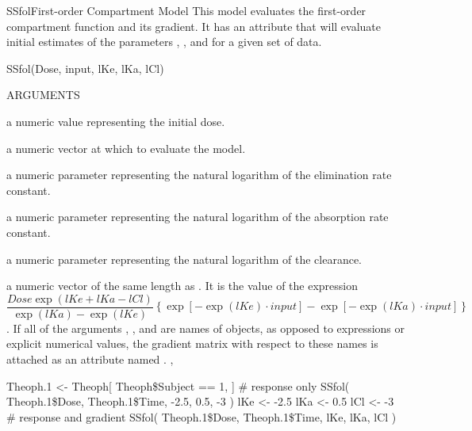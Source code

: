 \documentclass[pdftex]{article} \usepackage{url,graphicx}
\begin{document}
\begin{Helpfile}{SSfol}{First-order Compartment Model}
This  model evaluates the first-order compartment
function and its gradient.  It has an  attribute that 
will evaluate initial estimates of the parameters , ,
and  for a given set of data.
\begin{Example}
SSfol(Dose, input, lKe, lKa, lCl)
\end{Example}
\begin{Argument}{ARGUMENTS}
\item[\Co{Dose:}]
a numeric value representing the initial dose.
\item[\Co{input:}]
a numeric vector at which to evaluate the model.
\item[\Co{lKe:}]
a numeric parameter representing the natural logarithm of
the elimination rate constant.
\item[\Co{lKe:}]
a numeric parameter representing the natural logarithm of
the absorption rate constant.
\item[\Co{lCl:}]
a numeric parameter representing the natural logarithm of
the clearance.
\end{Argument}
a numeric vector of the same length as .  It is the value of
the expression $$\frac{Dose\exp(lKe+lKa-lCl)}{\exp(lKa) - \exp(lKe)}
\left\{\exp[-\exp(lKe) \cdot input] - \exp[-\exp(lKa)\cdot
input]\right\}$$.  If all of 
the arguments , , and  are
names of objects, as opposed to expressions or explicit numerical
values, the gradient matrix with respect to these names is attached as
an attribute named .
, 
\need 15pt
\vspace{-16pt} 
\begin{Example}
Theoph.1 <- Theoph[ Theoph\$Subject == 1, ]
# response only
SSfol( Theoph.1\$Dose, Theoph.1\$Time, -2.5, 0.5, -3 )  
lKe <- -2.5
lKa <- 0.5
lCl <- -3
# response and gradient
SSfol( Theoph.1\$Dose, Theoph.1\$Time, lKe, lKa, lCl ) 
\end{Example}
\end{Helpfile}
\end{document}
